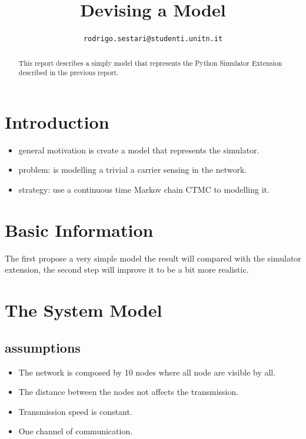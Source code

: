 \documentclass[conference]{IEEEtran}
\begin{document}
\title{Devising a Model}

\author{
	\texttt{rodrigo.sestari@studenti.unitn.it}
}

\maketitle

\begin{abstract}
This report describes a simply model that represents the Python Simulator Extension described in the previous report.

\end{abstract}

\acresetall

\section{Introduction}
\label{sec:introduction}

\begin{itemize}
\item general motivation is create a model that represents the simulator.
\item problem: is modelling a trivial a carrier sensing in the network.
\item strategy: use a continuous time Markov chain CTMC to modelling it.
\end{itemize}



\section{Basic Information}

The first propose a very simple model the result will compared with the simulator extension, the second step will improve it to be a bit more realistic.
 
 

\section{The System Model}

\subsection{assumptions}
\begin{itemize}
\item The network is composed by 10 nodes where all node are visible by all.
\item The distance between the nodes not affects the transmission.
\item Transmission speed is constant.
\item One channel of communication.
\end{itemize}
\end{document}
